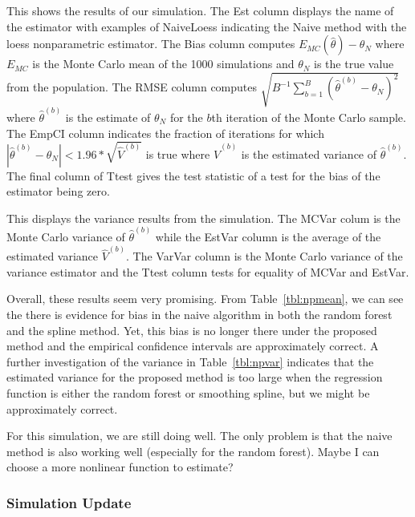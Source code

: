 \documentclass[12pt]{article}
\begin{document}
\begin{table}[ht!]
  \centering
  
  \caption{This shows the results of our simulation. The Est column displays the
  name of the estimator with examples of NaiveLoess indicating the Naive method
  with the loess nonparametric estimator. The Bias column computes $E_{MC}(\hat
  \theta) - \theta_N$ where $E_{MC}$ is the Monte Carlo mean of the 1000
  simulations and $\theta_N$ is the true value from the population. The RMSE
  column computes $\sqrt{B^{-1}\sum_{b = 1}^B (\hat \theta^{(b)} - \theta_N)^2}$
  where $\hat \theta^{(b)}$ is the estimate of $\theta_N$ for the $b$th
  iteration of the Monte Carlo sample. The EmpCI column indicates the fraction
  of iterations for which $|\hat \theta^{(b)} - \theta_N| < 1.96 * \sqrt{\hat V^{(b)}}$
  is true where $\hat V^{(b)}$ is the estimated variance of $\hat \theta^{(b)}$.
  The final column of Ttest gives the test statistic of a test for the bias of the
  estimator being zero.}
  \label{tbl:npmean}
\end{table}

\begin{table}[ht!]
  \centering
  
  \caption{This displays the variance results from the simulation. The MCVar
  colum is the Monte Carlo variance of $\hat \theta^{(b)}$ while the EstVar
  column is the average of the estimated variance $\hat V^{(b)}$. The VarVar
  column is the Monte Carlo variance of the variance estimator and the Ttest
  column tests for equality of MCVar and EstVar.}
  \label{tbl:npvar}
\end{table}

Overall, these results seem very promising. From Table~\ref{tbl:npmean}, we can
see the there is evidence for bias in the naive algorithm in both the random
forest and the spline method. Yet, this bias is no longer there under the
proposed method and the empirical confidence intervals are approximately
correct. A further investigation of the variance in Table~\ref{tbl:npvar}
indicates that the estimated variance for the proposed method is too large when
the regression function is either the random forest or smoothing spline, but we
might be approximately correct.

For this simulation, we are still doing well. The only problem is that the naive
method is also working well (especially for the random forest). Maybe I can
choose a more nonlinear function to estimate?

\subsubsection{Simulation Update}
\end{document}
